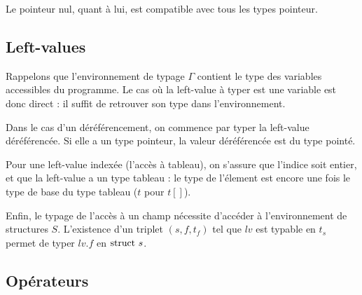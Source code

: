 \begin{mathpar}



\end{mathpar}

Le pointeur nul, quant à lui, est compatible avec tous les types pointeur.

\begin{mathpar}
\end{mathpar}

\subsection*{Left-values}

Rappelons que l'environnement de typage $Γ$ contient le type des variables
accessibles du programme. Le cas où la left-value à typer est une variable est
donc direct : il suffit de retrouver son type dans l'environnement.

\begin{mathpar}
\end{mathpar}

Dans le cas d'un déréférencement, on commence par typer la left-value
déréférencée. Si elle a un type pointeur, la valeur déréférencée est du type
pointé.

\begin{mathpar}
\end{mathpar}

Pour une left-value indexée (l'accès à tableau), on s'assure que l'indice soit
entier, et que la left-value a un type tableau : le type de l'élement est encore
une fois le type de base du type tableau ($t$ pour $t[]$).

\begin{mathpar}
\end{mathpar}

Enfin, le typage de l'accès à un champ nécessite d'accéder à l'environnement de
structures $S$. L'existence d'un triplet $(s, f, t_f)$ tel que $lv$ est
typable en $t_s$ permet de typer $lv.f$ en $\tstruct{s}$.

\begin{mathpar}
\end{mathpar}

\subsection*{Opérateurs}

